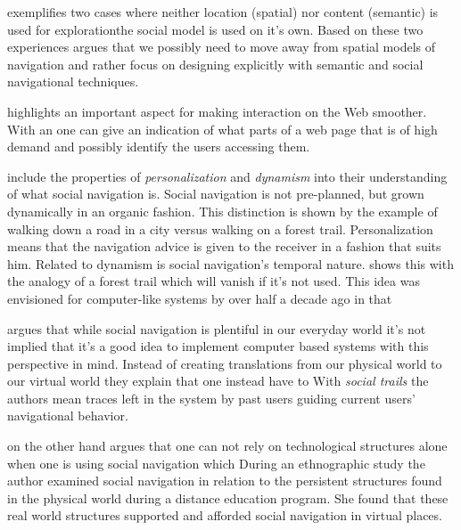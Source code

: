 \citeauthor{dourish94} exemplifies two cases where neither location
(spatial) nor content (semantic) is used for exploration\dash{}the social
model is used on it's own. Based on these two experiences
\citeauthor{dourish94} argues that we possibly need to move away from spatial
models of navigation and rather focus on designing explicitly with semantic
and social navigational techniques.

\citeauthor{dieberger97} highlights an important aspect for making interaction
on the Web smoother. With an
one can give an indication of what parts of a web page that is of high demand
and possibly identify the users accessing them.

\citet[p.~39]{dieberger00b} include the properties of \emph{personalization}
and \emph{dynamism} into their understanding of what social navigation is.
Social navigation is not pre-planned, but grown dynamically in an organic
fashion. This distinction is shown by the example of walking down a road in a
city versus walking on a forest trail. Personalization means that the
navigation advice is given to the receiver in a fashion that suits him.
Related to dynamism is social navigation's temporal nature.
\citet[p.~39]{dieberger00b} shows this with the analogy of a forest trail
which will vanish if it's not used. This idea was envisioned for computer-like
systems by \citeauthor{bush45} over half a decade ago in that

\citet{svensson05} argues that while social navigation is plentiful in
our everyday world it's not implied that it's a good idea to implement
computer based systems with this perspective in mind. Instead of creating
translations from our physical world to our virtual world
they explain that one instead have to
With \emph{social trails} the authors mean traces left in the system by past
users guiding current users' navigational behavior.

\citeauthor{robins02} on the other hand argues that one can not rely on
technological structures alone when one is using social navigation which
During an ethnographic study the author examined social navigation in relation
to the persistent structures found in the physical world during a distance
education program. She found that these real world structures supported and
afforded social navigation in virtual places.

